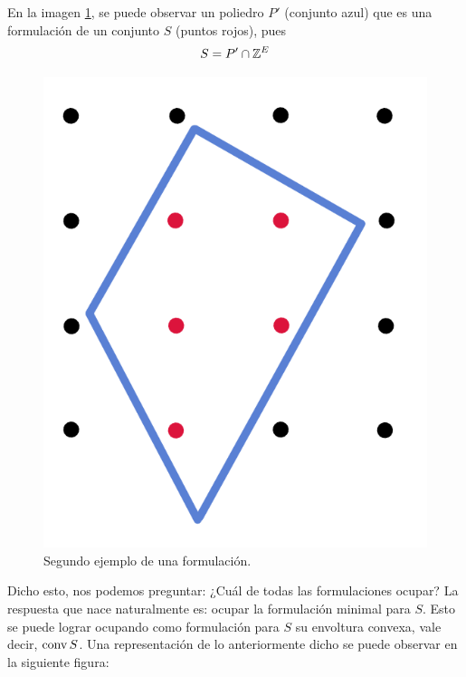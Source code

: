 \begin{eje} \label{eje:formulacion2}
En la imagen \ref{fig:formulacion2}, se puede observar un poliedro $P'$ (conjunto azul) que es una formulación de un conjunto $S$ (puntos rojos), pues $$S = P' \cap \mathbb Z^{E}$$ 
\begin{figure}[H] 
    \centering
    \includegraphics[scale=0.3]{formulacion2.png}
    \caption{Segundo ejemplo de una formulación.}
    \label{fig:formulacion2}
\end{figure}
\end{eje}

Dicho esto, nos podemos preguntar: ¿Cuál de todas las formulaciones ocupar? La respuesta que nace naturalmente es: ocupar la formulación minimal para $S$. Esto se puede lograr ocupando como formulación para $S$ su envoltura convexa, vale decir, $\operatorname{conv} S$. Una representación de lo anteriormente dicho se puede observar en la siguiente figura:

